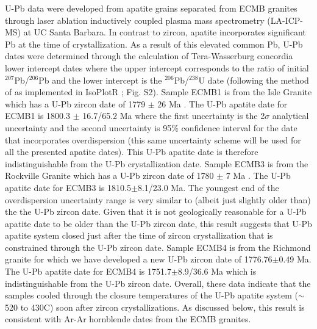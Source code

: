 \documentclass[draft]{agujournal2019}
\begin{document}
U-Pb data were developed from apatite grains separated from ECMB granites through laser ablation inductively coupled plasma mass spectrometry (LA-ICP-MS) at UC Santa Barbara. In contrast to zircon, apatite incorporates significant Pb at the time of crystallization. As a result of this elevated common Pb, U-Pb dates were determined through the calculation of Tera-Wasserburg concordia lower intercept dates where the upper intercept corresponds to the ratio of initial $^{207}$Pb/$^{206}$Pb and the lower intercept is the $^{206}$Pb/$^{238}$U date (following the method of  as implemented in IsoPlotR ; Fig. S2). Sample ECMB1 is from the Isle Granite which has a U-Pb zircon date of 1779 $\pm$ 26 Ma \cite{Holm2005a}. The U-Pb apatite date for ECMB1 is 1800.3 $\pm$ 16.7/65.2 Ma where the first uncertainty is the 2$\sigma$ analytical uncertainty and the second uncertainty is 95$\%$ confidence interval for the date that incorporates overdispersion (this same uncertainty scheme will be used for all the presented apatite dates). This U-Pb apatite date is therefore indistinguishable from the U-Pb crystallization date. Sample ECMB3 is from the Rockville Granite which has a U-Pb zircon date of 1780 $\pm$ 7 Ma \cite{Holm2005a}. The U-Pb apatite date for ECMB3 is 1810.5$\pm$8.1/23.0 Ma. The youngest end of the overdispersion uncertainty range is very similar to (albeit just slightly older than) the the U-Pb zircon date. Given that it is not geologically reasonable for a U-Pb apatite date to be older than the U-Pb zircon date, this result suggests that U-Pb apatite system closed just after the time of zircon crystallization that is constrained through the U-Pb zircon date.  Sample ECMB4 is from the Richmond granite for which we have developed a new U-Pb zircon date of 1776.76$\pm$0.49 Ma. The U-Pb apatite date for ECMB4 is 1751.7$\pm$8.9/36.6 Ma which is indistinguishable from the U-Pb zircon date. Overall, these data indicate that the samples cooled through the closure temperatures of the U-Pb apatite system ($\sim$ 520 to 430\textdegree C) soon after zircon crystallizations. As discussed below, this result is consistent with Ar-Ar hornblende dates from the ECMB granites.

%
%
%
%
%
%
%
%
%
%
\end{document}
